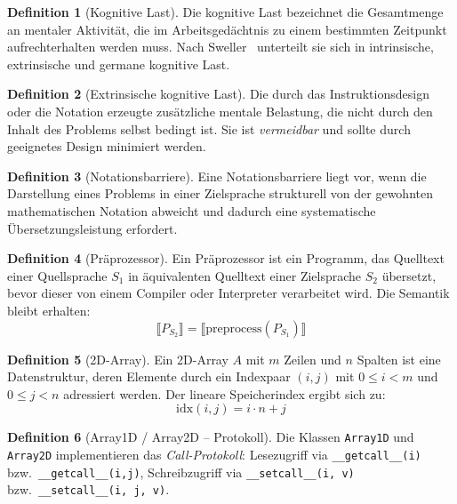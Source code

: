 ﻿\documentclass[a4paper,12pt]{article}
\theoremstyle{definition}
\newtheorem{definition}{Definition}
\begin{document}
\begin{definition}[Kognitive Last]
	Die kognitive Last bezeichnet die Gesamtmenge an mentaler Aktivit\"at, die im
	Arbeitsged\"achtnis zu einem bestimmten Zeitpunkt aufrechterhalten werden muss.
	Nach Sweller~\cite{sweller1988} unterteilt sie sich in intrinsische, extrinsische
	und germane kognitive Last.
\end{definition}

\begin{definition}[Extrinsische kognitive Last]
	Die durch das Instruktionsdesign oder die Notation erzeugte zus\"atzliche mentale
	Belastung, die nicht durch den Inhalt des Problems selbst bedingt ist. Sie ist
	\emph{vermeidbar} und sollte durch geeignetes Design minimiert werden.
\end{definition}

\begin{definition}[Notationsbarriere]
	Eine Notationsbarriere liegt vor, wenn die Darstellung eines Problems in einer
	Zielsprache strukturell von der gewohnten mathematischen Notation abweicht und
	dadurch eine systematische \"Ubersetzungsleistung erfordert.
\end{definition}

\begin{definition}[Pr\"aprozessor]
	Ein Pr\"aprozessor ist ein Programm, das Quelltext einer Quellsprache $S_1$ in
	\"aquivalenten Quelltext einer Zielsprache $S_2$ \"ubersetzt, bevor dieser von
	einem Compiler oder Interpreter verarbeitet wird. Die Semantik bleibt erhalten:
	\[
		\llbracket P_{S_2} \rrbracket = \llbracket \text{preprocess}(P_{S_1}) \rrbracket
	\]
\end{definition}

\begin{definition}[2D-Array]
	Ein 2D-Array $A$ mit $m$ Zeilen und $n$ Spalten ist eine Datenstruktur, deren
	Elemente durch ein Indexpaar $(i, j)$ mit $0 \leq i < m$ und $0 \leq j < n$
	adressiert werden. Der lineare Speicherindex ergibt sich zu:
	\[
		\text{idx}(i, j) = i \cdot n + j
	\]
\end{definition}

\begin{definition}[Array1D / Array2D -- Protokoll]
	Die Klassen \texttt{Array1D} und \texttt{Array2D} implementieren das
	\emph{Call-Protokoll}: Lesezugriff via \texttt{\_\_getcall\_\_(i)} bzw.\
	\texttt{\_\_getcall\_\_(i,j)}, Schreibzugriff via \texttt{\_\_setcall\_\_(i, v)}
	bzw.\ \texttt{\_\_setcall\_\_(i, j, v)}.
\end{definition}
\end{document}
